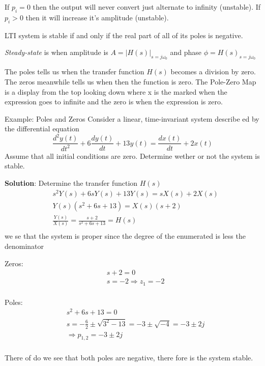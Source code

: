 If $p_i=0$ then the output will never convert just alternate to infinity (unstable). \newline
\indent If $p_i>0$ then it will increase it's amplitude (unstable). \newline

LTI system is stable if and only if the real part of all of its poles is negative. \newline

\textit{Steady-state} is when amplitude is $A=|H(s)|_{s=j\omega_0}$ and phase $\phi=H(s)_{s=j\omega_0}$ \newline

The poles tells us when the transfer function $H(s)$ becomes a division by zero. 
The zeros meanwhile tells us when then the function is zero. The Pole-Zero Map 
is a display from the top looking down where x is the marked when the expression goes to infinite and
the zero is when the expression is zero.

\begin{exampleblock}{Example: Poles and Zeros}%
Consider a linear, time-invariant system describe ed by the differential equation
\begin{equation*}
    \frac{d^2y(t)}{dt^2} + 6\frac{dy(t)}{dt} + 13y(t) = \frac{dx(t)}{dt} + 2x(t)
\end{equation*}
Assume that all initial conditions are zero.
Determine wether or not the system is stable.

\textbf{Solution}:
Determine the transfer function $H(s)$
\begin{align*}
    &s^2Y(s) +6sY(s) + 13Y(s) = sX(s) + 2X(s) \\
    &Y(s)(s^2+6s+13) = X(s)(s+2) \\
    &\frac{Y(s)}{X(s)} = \frac{s+2}{s^2+6s+13} = H(s) \\
\end{align*}
we se that the system is proper since the degree of the enumerated is less the denominator

Zeros:
\begin{align*}
    &s+2=0 \\
    &s=-2 \Rightarrow z_1=-2 \\
\end{align*}

Poles:
\begin{align*}
    &s^2+6s+13 = 0 \\
    &s=-\frac{6}{2}\pm\sqrt{3^2-13}=-3\pm\sqrt{-4}=-3\pm 2j \\
    &\Rightarrow p_{1,2} = -3\pm 2j \\
\end{align*}

There of do we see that both poles are negative, there fore is the system stable.
\end{exampleblock}

